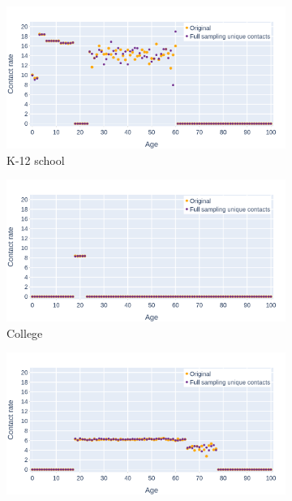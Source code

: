 \begin{figure}
    \centering
    \begin{subfigure}{.8\linewidth}
        \centering
        \includegraphics[width=\textwidth]{4 - Sampling/fig/full_sampling_unique_contacts/fsuc_vs_standard_reverse_cr_k12school.png}
        \caption{K-12 school}
        \label{fig:fsuc_vs_standard_reversed_cr_k12school}
    \end{subfigure}
    \begin{subfigure}{.8\linewidth}
        \centering
        \includegraphics[width=\textwidth]{4 - Sampling/fig/full_sampling_unique_contacts/fsuc_vs_standard_reverse_cr_college.png}
        \caption{College}
        \label{fig:fsuc_vs_standard_reversed_cr_college}
    \end{subfigure}
    \begin{subfigure}{.8\linewidth}
        \centering
        \includegraphics[width=\textwidth]{4 - Sampling/fig/full_sampling_unique_contacts/fsuc_vs_standard_reverse_cr_workplace.png}

\end{subfigure}
\end{figure}
